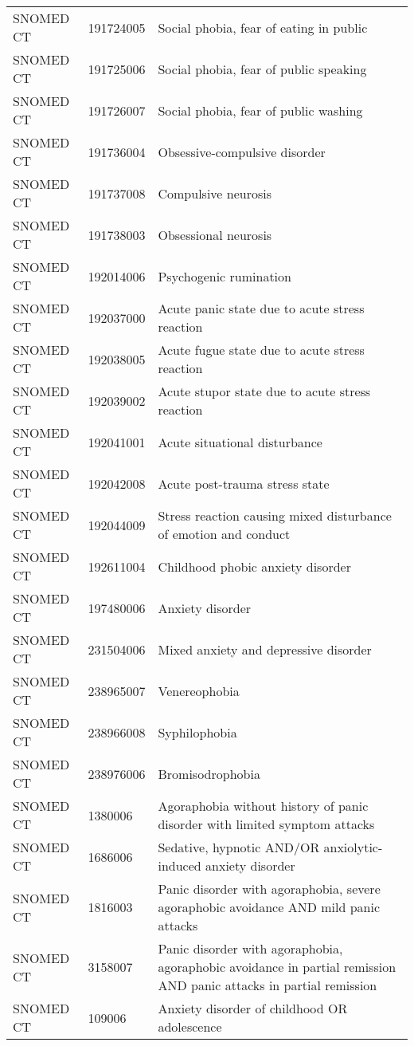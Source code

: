 \begin{longtable}{p{}p{}p{}}
  SNOMED CT & 191724005 & Social phobia, fear of eating in public \\ 
  SNOMED CT & 191725006 & Social phobia, fear of public speaking \\ 
  SNOMED CT & 191726007 & Social phobia, fear of public washing \\ 
  SNOMED CT & 191736004 & Obsessive-compulsive disorder \\ 
  SNOMED CT & 191737008 & Compulsive neurosis \\ 
  SNOMED CT & 191738003 & Obsessional neurosis \\ 
  SNOMED CT & 192014006 & Psychogenic rumination \\ 
  SNOMED CT & 192037000 & Acute panic state due to acute stress reaction \\ 
  SNOMED CT & 192038005 & Acute fugue state due to acute stress reaction \\ 
  SNOMED CT & 192039002 & Acute stupor state due to acute stress reaction \\ 
  SNOMED CT & 192041001 & Acute situational disturbance \\ 
  SNOMED CT & 192042008 & Acute post-trauma stress state \\ 
  SNOMED CT & 192044009 & Stress reaction causing mixed disturbance of emotion and conduct \\ 
  SNOMED CT & 192611004 & Childhood phobic anxiety disorder \\ 
  SNOMED CT & 197480006 & Anxiety disorder \\ 
  SNOMED CT & 231504006 & Mixed anxiety and depressive disorder \\ 
  SNOMED CT & 238965007 & Venereophobia \\ 
  SNOMED CT & 238966008 & Syphilophobia \\ 
  SNOMED CT & 238976006 & Bromisodrophobia \\ 
  SNOMED CT & 1380006 & Agoraphobia without history of panic disorder with limited symptom attacks \\ 
  SNOMED CT & 1686006 & Sedative, hypnotic AND/OR anxiolytic-induced anxiety disorder \\ 
  SNOMED CT & 1816003 & Panic disorder with agoraphobia, severe agoraphobic avoidance AND mild panic attacks \\ 
  SNOMED CT & 3158007 & Panic disorder with agoraphobia, agoraphobic avoidance in partial remission AND panic attacks in partial remission \\ 
  SNOMED CT & 109006 & Anxiety disorder of childhood OR adolescence \\ 

\end{longtable}
